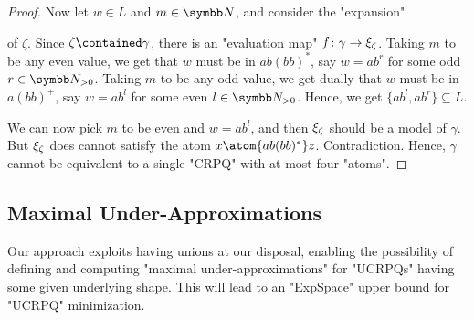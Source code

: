 \begin{proof}
	Now let $w \in L$ and $m \in \N$, and consider the "expansion"
	\begin{center}
		\small
	\end{center}
	of $\zeta$. Since $\zeta \contained \gamma$, there is
	an "evaluation map" $f\colon \gamma \to \xi_\zeta$.
	Taking $m$ to be any even value, we get that $w$ must be in $ab(bb)^*$,
	say $w = ab^r$ for some odd $r \in \Np$.
	Taking $m$ to be any odd value, we get dually that $w$ must be in $a(bb)^+$,
	say $w = ab^l$ for some even $l \in \Np$.
	Hence, we get $\{ab^l, ab^r\} \subseteq L$.

	We can now pick $m$ to be even and
	$w = ab^l$, and then $\xi_\zeta$ should be a model of $\gamma$.
	But $\xi_\zeta$ does cannot satisfy the atom $x \atom{ab(bb)^*} z$.
	Contradiction. Hence, $\gamma$ cannot be equivalent to a single "CRPQ"
	with at most four "atoms".
\end{proof}

\subsection{Maximal Under-Approximations}

\AP\label{sec:maximal-under-approxiamtions}
Our approach exploits having unions at our disposal, enabling the possibility of defining and computing "maximal under-approximations" for "UCRPQs" having some given underlying shape. This will lead to an "ExpSpace" upper bound for "UCRPQ" minimization.

